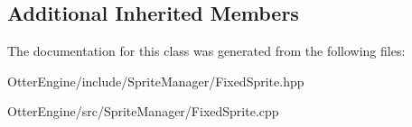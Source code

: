 \subsection*{Additional Inherited Members}


The documentation for this class was generated from the following files\+:\begin{DoxyCompactItemize}
\item 
Otter\+Engine/include/\+Sprite\+Manager/Fixed\+Sprite.\+hpp\item 
Otter\+Engine/src/\+Sprite\+Manager/Fixed\+Sprite.\+cpp\end{DoxyCompactItemize}

